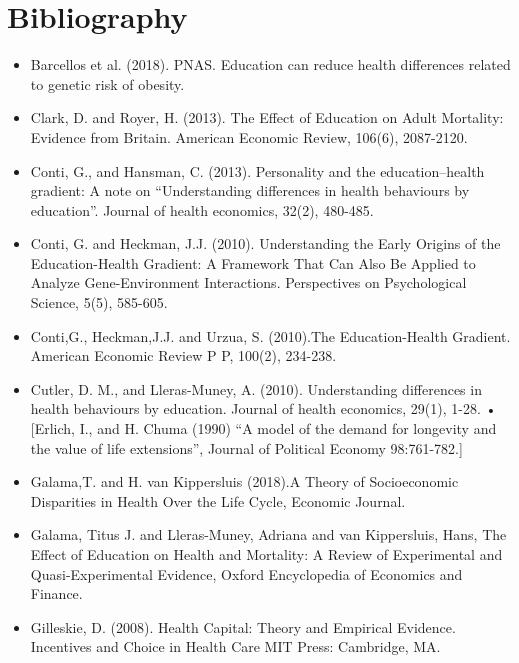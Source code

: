 \clearpage










\section*{Bibliography}

    \begin{itemize}
        \item Barcellos et al. (2018). PNAS. Education can reduce health differences related to genetic risk of obesity.
        \item Clark, D. and Royer, H. (2013). The Effect of Education on Adult Mortality: Evidence from Britain. American Economic Review, 106(6),
        2087-2120.
        \item Conti, G., and Hansman, C. (2013). Personality and the education–health gradient: A note on “Understanding differences in health
        behaviours by education”. Journal of health economics, 32(2), 480-485.
        \item Conti, G. and Heckman, J.J. (2010). Understanding the Early Origins of the Education-Health Gradient: A Framework That Can Also Be Applied to Analyze Gene-Environment Interactions. Perspectives on Psychological Science, 5(5), 585-605.
        \item Conti,G., Heckman,J.J. and Urzua, S. (2010).The Education-Health Gradient. American Economic Review P P, 100(2), 234-238.
        \item Cutler, D. M., and Lleras-Muney, A. (2010). Understanding differences in health behaviours by education. Journal of health economics,
        29(1), 1-28.
        • [Erlich, I., and H. Chuma (1990) “A model of the demand for longevity and the value of life extensions”, Journal of Political Economy
        98:761-782.]
        \item Galama,T. and H. van Kippersluis (2018).A Theory of Socioeconomic Disparities in Health Over the Life Cycle, Economic Journal.
        \item Galama, Titus J. and Lleras-Muney, Adriana and van Kippersluis, Hans, The Effect of Education on Health and Mortality: A Review of
        Experimental and Quasi-Experimental Evidence, Oxford Encyclopedia of Economics and Finance.
        \item Gilleskie, D. (2008). Health Capital: Theory and Empirical Evidence. Incentives and Choice in Health Care MIT Press: Cambridge, MA.

\end{itemize}
